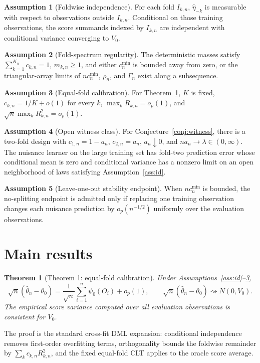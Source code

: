 \documentclass[11pt]{article}
\theoremstyle{definition}
\newtheorem{assumption}{Assumption}
\theoremstyle{plain}
\newtheorem{theorem}{Theorem}
\theoremstyle{remark}
\begin{document}
\begin{assumption}[Foldwise independence]\label{ass:split}
For each fold \(I_{k,n}\), \(\hat\eta_{-k}\) is measurable with respect to observations outside \(I_{k,n}\). Conditional on those training observations, the score summands indexed by \(I_{k,n}\) are independent with conditional variance converging to \(V_0\).
\end{assumption}

\begin{assumption}[Fold-spectrum regularity]\label{ass:spectrum}
The deterministic masses satisfy \(\sum_{k=1}^{K_n}c_{k,n}=1\), \(m_{k,n}\ge1\), and either \(c_n^{\min}\) is bounded away from zero, or the triangular-array limits of \(n c_n^{\min}\), \(\rho_n\), and \(\Gamma_n\) exist along a subsequence.
\end{assumption}

\begin{assumption}[Equal-fold calibration]\label{ass:equal}
For Theorem~\ref{thm:equal}, \(K\) is fixed, \(c_{k,n}=1/K+o(1)\) for every \(k\), \(\max_k R_{k,n}=o_p(1)\), and \(\sqrt n\max_k R_{k,n}^2=o_p(1)\).
\end{assumption}

\begin{assumption}[Open witness class]\label{ass:witness}
For Conjecture~\ref{conj:witness}, there is a two-fold design with \(c_{1,n}=1-a_n\), \(c_{2,n}=a_n\), \(a_n\downarrow0\), and \(n a_n\to\lambda\in(0,\infty)\). The nuisance learner on the large training set has fold-two prediction error whose conditional mean is zero and conditional variance has a nonzero limit on an open neighborhood of laws satisfying Assumption~\ref{ass:id}.
\end{assumption}

\begin{assumption}[Leave-one-out stability endpoint]\label{ass:loo}
When \(n c_n^{\min}\) is bounded, the no-splitting endpoint is admitted only if replacing one training observation changes each nuisance prediction by \(o_p(n^{-1/2})\) uniformly over the evaluation observations.
\end{assumption}

\section{Main results}
\begin{theorem}[Theorem 1: equal-fold calibration]\label{thm:equal}
Under Assumptions~\ref{ass:id}--\ref{ass:equal},
\[
  \sqrt n(\hat\theta_n-\theta_0)=\frac{1}{\sqrt n}\sum_{i=1}^n\psi_0(O_i)+o_p(1),
  \qquad
  \sqrt n(\hat\theta_n-\theta_0)\rightsquigarrow N(0,V_0).
\]
The empirical score variance computed over all evaluation observations is consistent for \(V_0\).
\end{theorem}
The proof is the standard cross-fit DML expansion: conditional independence removes first-order overfitting terms, orthogonality bounds the foldwise remainder by \(\sum_k c_{k,n}R_{k,n}^2\), and the fixed equal-fold CLT applies to the oracle score average.
\end{document}
